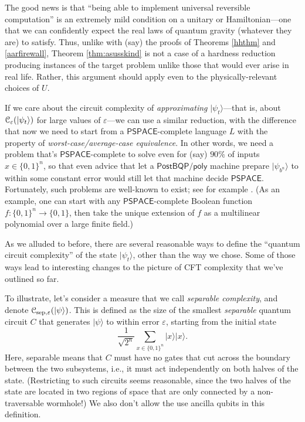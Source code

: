 \documentclass[11pt]{report}
\theoremstyle{plain}
\theoremstyle{definition}
\newcommand{\eps}{\varepsilon}
\renewcommand{\ket}[1]{|#1\rangle}
\begin{document}
The good news is that ``being able to implement universal reversible computation'' is an extremely mild condition on a unitary or Hamiltonian---one that we can confidently expect the real laws of quantum gravity (whatever they are) to satisfy.  Thus, unlike with (say) the proofs of Theorems \ref{hhthm} and \ref{aarfirewall}, Theorem \ref{thm:asusskind} is not a case of a hardness reduction producing instances of the target problem unlike those that would ever arise in real life.  Rather, this argument should apply even to the physically-relevant choices of $U$.

If we care about the circuit complexity of {\em approximating} $\ket{\psi_t}$---that is, about ${\cal C}_\eps(\ket{\psi_t})$ for large values of $\eps$---we can use a similar reduction, with the difference that now we need to start from a $\mathsf{PSPACE}$-complete language $L$ with the property of {\em worst-case/average-case equivalence}.  In other words, we need a problem that's $\mathsf{PSPACE}$-complete to solve even for (say) $90\%$ of inputs $x\in \{0,1\}^n$, so that even advice that let a $\mathsf{PostBQP/poly}$ machine prepare $\ket{\psi_{b^n}}$ to within some constant error would still let that machine decide $\mathsf{PSPACE}$.  Fortunately, such problems are well-known to exist; see for example \cite{AFK89}.  (As an example, one can start with any $\mathsf{PSPACE}$-complete Boolean function $f:\{0,1\}^n \longrightarrow \{0,1\}$, then take the unique extension of $f$ as a multilinear polynomial over a large finite field.)

As we alluded to before, there are several reasonable ways to define the ``quantum circuit complexity'' of the state $\ket{\psi_t}$, other than the way we chose.  Some of those ways lead to interesting changes to the picture of CFT complexity that we've outlined so far.

To illustrate, let's consider a measure that we call {\em separable complexity}, and
denote ${\cal C}_{\mathrm{sep},\eps}(\ket{\psi})$.  This is defined as the size of the smallest \emph{separable} quantum circuit $C$ that generates $\ket{\psi}$ to within error $\eps$, starting from the initial state
$$ \frac{1}{\sqrt{2^n}} \sum_{x\in \{0,1\}^n} \ket{x}\ket{x}. $$
Here, separable means that $C$ must have no gates that cut across the boundary between the two subsystems, i.e., it must act independently on both halves of the state.  (Restricting to such circuits seems reasonable, since the two halves of the state are located in two regions of space that are only connected by a non-traversable wormhole!)  We also don't allow the use ancilla qubits in this definition.
\end{document}
